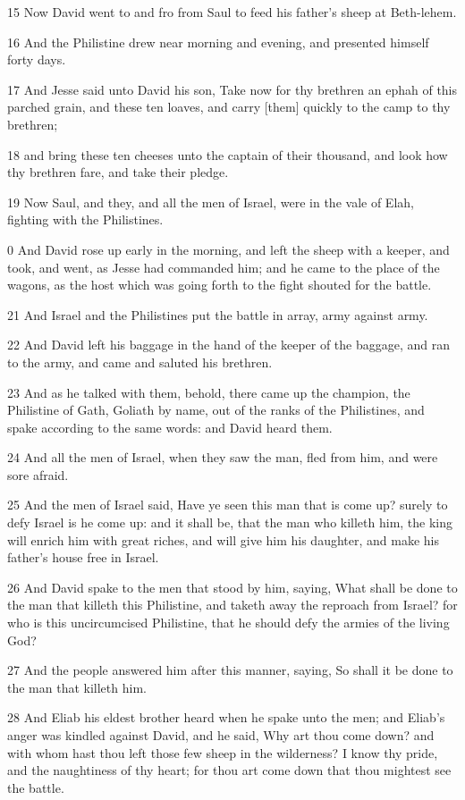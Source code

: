 \par 15 Now David went to and fro from Saul to feed his father's sheep at Beth-lehem.
\par 16 And the Philistine drew near morning and evening, and presented himself forty days.
\par 17 And Jesse said unto David his son, Take now for thy brethren an ephah of this parched grain, and these ten loaves, and carry [them] quickly to the camp to thy brethren;
\par 18 and bring these ten cheeses unto the captain of their thousand, and look how thy brethren fare, and take their pledge.
\par 19 Now Saul, and they, and all the men of Israel, were in the vale of Elah, fighting with the Philistines.
\par 0 And David rose up early in the morning, and left the sheep with a keeper, and took, and went, as Jesse had commanded him; and he came to the place of the wagons, as the host which was going forth to the fight shouted for the battle.
\par 21 And Israel and the Philistines put the battle in array, army against army.
\par 22 And David left his baggage in the hand of the keeper of the baggage, and ran to the army, and came and saluted his brethren.
\par 23 And as he talked with them, behold, there came up the champion, the Philistine of Gath, Goliath by name, out of the ranks of the Philistines, and spake according to the same words: and David heard them.
\par 24 And all the men of Israel, when they saw the man, fled from him, and were sore afraid.
\par 25 And the men of Israel said, Have ye seen this man that is come up? surely to defy Israel is he come up: and it shall be, that the man who killeth him, the king will enrich him with great riches, and will give him his daughter, and make his father's house free in Israel.
\par 26 And David spake to the men that stood by him, saying, What shall be done to the man that killeth this Philistine, and taketh away the reproach from Israel? for who is this uncircumcised Philistine, that he should defy the armies of the living God?
\par 27 And the people answered him after this manner, saying, So shall it be done to the man that killeth him.
\par 28 And Eliab his eldest brother heard when he spake unto the men; and Eliab's anger was kindled against David, and he said, Why art thou come down? and with whom hast thou left those few sheep in the wilderness? I know thy pride, and the naughtiness of thy heart; for thou art come down that thou mightest see the battle.

